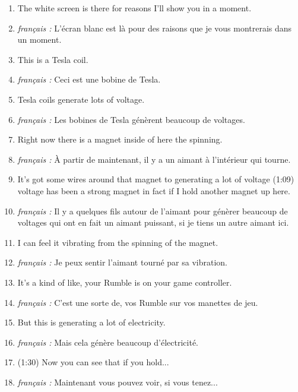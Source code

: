 \documentclass[../main.tex]{subfiles}
\begin{document}
\begin{enumerate}
    \item The white screen is there for reasons
    I'll show you in a moment.
     \item \hspace*{1cm} \emph{ français :} L'écran blanc est là pour des raisons que je vous montrerais dans un moment.
    \item This is a Tesla coil.
     \item \hspace*{1cm} \emph{ français :} Ceci est une bobine de Tesla.
    \item Tesla coils generate lots of voltage.
     \item \hspace*{1cm} \emph{ français :} Les bobines de Tesla génèrent beaucoup de voltages.
    \item Right now there is a magnet inside of here the spinning.
     \item \hspace*{1cm} \emph{ français :} À partir de maintenant, il y a un aimant à l'intérieur qui tourne.
    \item It's got some wires around that magnet to generating a lot of voltage (1:09) voltage has been a strong magnet in fact if I hold another magnet up here.
     \item \hspace*{1cm} \emph{ français :} Il y a quelques fils autour de l'aimant pour génèrer beaucoup de voltages qui ont en fait un aimant puissant, si je tiens un autre aimant ici.
    \item I can feel it vibrating from the spinning of the magnet.
     \item \hspace*{1cm} \emph{ français :} Je peux sentir l'aimant tourné par sa vibration.
    \item It's a kind of like, your Rumble is on your game controller.
     \item \hspace*{1cm} \emph{ français :} C'est une sorte de, vos Rumble sur vos manettes de jeu.
    \item But this is generating a lot of electricity.
     \item \hspace*{1cm} \emph{ français :} Mais cela génère beaucoup d'électricité.
    \item (1:30) Now you can see that if you hold...
     \item \hspace*{1cm} \emph{ français :} Maintenant vous pouvez voir, si vous tenez...

\end{enumerate}
\end{document}
